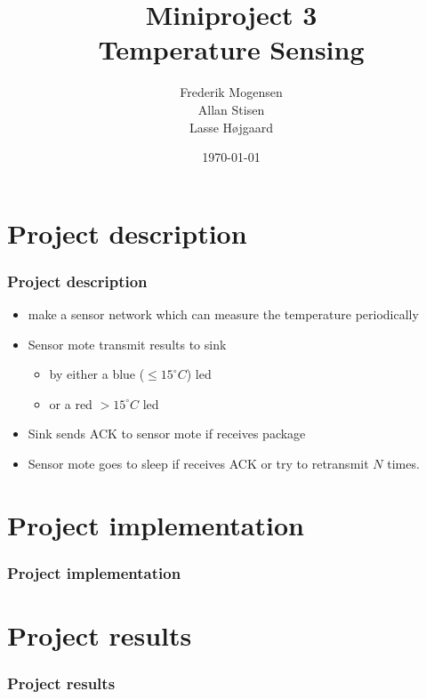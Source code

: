 \documentclass{beamer}
\title[Temperature Sensing]{Miniproject 3 \\ Temperature Sensing}
\author{Frederik Mogensen\\
    Allan Stisen \\
    Lasse Højgaard }
\date{\today}
\begin{document}
 \AtBeginSection[]
{
  \begin{frame}
    \tableofcontents[currentsection]
  \end{frame}
}
\begin{frame}
\titlepage
\end{frame}

\section{Project description}

\begin{frame}
\frametitle{Project description}

\begin{itemize}
	\item make a  sensor network which can measure the temperature periodically
	\item Sensor mote transmit results to sink
	\begin{itemize}
		\item by either a blue ($\leq 15^{\circ} C $) led
		\item or a red $>15^{\circ} C$ led 
	\end{itemize}
	\item Sink sends ACK to sensor mote if receives package
	\item Sensor mote goes to sleep if receives ACK or try to retransmit $N$ times.
\end{itemize}
\end{frame}
\section{Project implementation}
\begin{frame}
\frametitle{Project implementation}

\end{frame}

\section{Project results}

\begin{frame}
\frametitle{Project results}
 
\end{frame}
\end{document}
